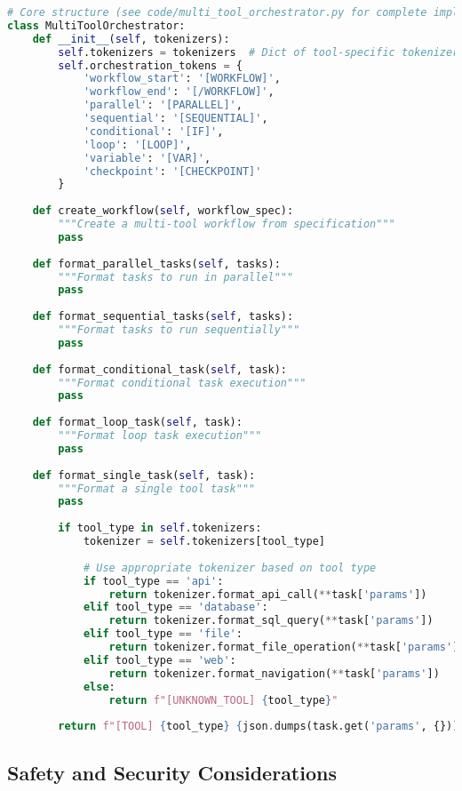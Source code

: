 \begin{lstlisting}[language=Python, caption=Multi-tool orchestration system]
# Core structure (see code/multi_tool_orchestrator.py for complete implementation)
class MultiToolOrchestrator:
    def __init__(self, tokenizers):
        self.tokenizers = tokenizers  # Dict of tool-specific tokenizers
        self.orchestration_tokens = {
            'workflow_start': '[WORKFLOW]',
            'workflow_end': '[/WORKFLOW]',
            'parallel': '[PARALLEL]',
            'sequential': '[SEQUENTIAL]',
            'conditional': '[IF]',
            'loop': '[LOOP]',
            'variable': '[VAR]',
            'checkpoint': '[CHECKPOINT]'
        }
    
    def create_workflow(self, workflow_spec):
        """Create a multi-tool workflow from specification"""
        pass
    
    def format_parallel_tasks(self, tasks):
        """Format tasks to run in parallel"""
        pass
    
    def format_sequential_tasks(self, tasks):
        """Format tasks to run sequentially"""
        pass
    
    def format_conditional_task(self, task):
        """Format conditional task execution"""
        pass
    
    def format_loop_task(self, task):
        """Format loop task execution"""
        pass
    
    def format_single_task(self, task):
        """Format a single tool task"""
        pass
        
        if tool_type in self.tokenizers:
            tokenizer = self.tokenizers[tool_type]
            
            # Use appropriate tokenizer based on tool type
            if tool_type == 'api':
                return tokenizer.format_api_call(**task['params'])
            elif tool_type == 'database':
                return tokenizer.format_sql_query(**task['params'])
            elif tool_type == 'file':
                return tokenizer.format_file_operation(**task['params'])
            elif tool_type == 'web':
                return tokenizer.format_navigation(**task['params'])
            else:
                return f"[UNKNOWN_TOOL] {tool_type}"
        
        return f"[TOOL] {tool_type} {json.dumps(task.get('params', {}))}"
\end{lstlisting}

\subsection{Safety and Security Considerations}

